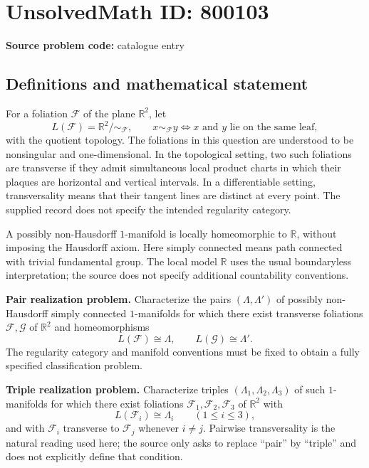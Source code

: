 \documentclass[11pt]{article}
\newcommand{\R}{\mathbb{R}}
\begin{document}
\section*{UnsolvedMath ID: 800103}
\textbf{Source problem code:} catalogue entry
\subsection{Definitions and mathematical statement}
For a foliation \(\mathcal F\) of the plane \(\R^2\), let
\[
L(\mathcal F)=\R^2/{\sim_{\mathcal F}},
\qquad x\sim_{\mathcal F}y\iff x\text{ and }y\text{ lie on the same leaf},
\]
with the quotient topology. The foliations in this question are understood to be nonsingular and one-dimensional. In the topological setting, two such foliations are transverse if they admit simultaneous local product charts in which their plaques are horizontal and vertical intervals. In a differentiable setting, transversality means that their tangent lines are distinct at every point. The supplied record does not specify the intended regularity category.

A possibly non-Hausdorff \(1\)-manifold is locally homeomorphic to \(\R\), without imposing the Hausdorff axiom. Here simply connected means path connected with trivial fundamental group. The local model \(\R\) uses the usual boundaryless interpretation; the source does not specify additional countability conventions.

\textbf{Pair realization problem.} Characterize the pairs \((\Lambda,\Lambda')\) of possibly non-Hausdorff simply connected \(1\)-manifolds for which there exist transverse foliations \(\mathcal F,\mathcal G\) of \(\R^2\) and homeomorphisms
\[
L(\mathcal F)\cong\Lambda,
\qquad L(\mathcal G)\cong\Lambda'.
\]
The regularity category and manifold conventions must be fixed to obtain a fully specified classification problem.

\textbf{Triple realization problem.} Characterize triples \((\Lambda_1,\Lambda_2,\Lambda_3)\) of such \(1\)-manifolds for which there exist foliations \(\mathcal F_1,\mathcal F_2,\mathcal F_3\) of \(\R^2\) with
\[
L(\mathcal F_i)\cong\Lambda_i\qquad(1\leq i\leq3),
\]
and with \(\mathcal F_i\) transverse to \(\mathcal F_j\) whenever \(i\ne j\). Pairwise transversality is the natural reading used here; the source only asks to replace ``pair'' by ``triple'' and does not explicitly define that condition.
\end{document}
